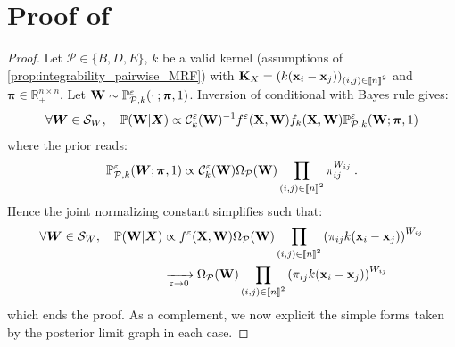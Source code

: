 \section{Proof of }
\label{proof:posterior_limit}

\posteriorW

\begin{proof}
Let $\mathcal{P} \in \{B, D, E\}$, $k$ be a valid kernel (assumptions of \cref{prop:integrability_pairwise_MRF}) with $\mathbf{K}_{X} = (k(\mathbf{x}_{i} - \mathbf{x}_{j}))_{(i,j) \in {[\![n]\!]}^2}$ and $\bm{\pi} \in \mathbb{R}_+^{n \times n}$. Let $\mathbf{W} \sim \mathbb{P}_{\mathcal{P},k}^{\varepsilon}(\cdot \: ; \bm{\pi},1)$. Inversion of conditional with Bayes rule gives:
\begin{align}
    \forall \bm{W} \in \mathcal{S}_{W}, \quad \mathbb{P}(\mathbf{W} | \bm{X}) \propto
    \mathcal{C}_{k}^{\varepsilon}(\mathbf{W})^{-1} f^{\varepsilon}(\mathbf{X}, \mathbf{W}) f_{k}(\mathbf{X}, \mathbf{W}) \mathbb{P}^{\varepsilon}_{\mathcal{P},k}(\mathbf{W}; \bm{\pi}, 1) \label{inversion_Conditional}
\end{align}
where the prior reads:
\begin{align}
    \mathbb{P}_{\mathcal{P},k}^{\varepsilon}(\bm{W}; \bm{\pi}, 1) \propto \mathcal{C}^{\varepsilon}_k(\mathbf{W}) \Omega_{\mathcal{P}}(\mathbf{W}) \prod_{(i,j) \in {[\![n]\!]}^2} \pi_{ij}^{W_{ij}} \:.
\end{align}
Hence the joint normalizing constant simplifies such that:
\begin{align}
    \forall \bm{W} \in \mathcal{S}_{W}, \quad \mathbb{P}(\mathbf{W} | \bm{X}) &\propto
    f^{\varepsilon}(\mathbf{X}, \mathbf{W}) \Omega_{\mathcal{P}}(\mathbf{W}) \prod_{(i,j) \in {[\![n]\!]}^2} \left(\pi_{ij} k(\mathbf{x}_i - \mathbf{x}_j)\right)^{W_{ij}} \\
    &\xrightarrow[\varepsilon \to 0]{} \Omega_{\mathcal{P}}(\mathbf{W}) \prod_{(i,j) \in {[\![n]\!]}^2}  \left(\pi_{ij} k(\mathbf{x}_i - \mathbf{x}_j)\right)^{W_{ij}}
\end{align}
which ends the proof. As a complement, we now explicit the simple forms taken by the posterior limit graph in each case.


\end{proof}
